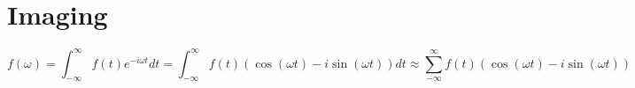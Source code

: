\section{Imaging}




\begin{displaymath}
  f(\omega) = \int^\infty_{-\infty}f(t)e^{-i \omega t} dt = \int^\infty_{-\infty}f(t)(\cos(\omega t) - i \sin(\omega t)) dt \approx \sum^\infty_{-\infty}f(t)(\cos(\omega t) - i \sin(\omega t))
\end{displaymath}


